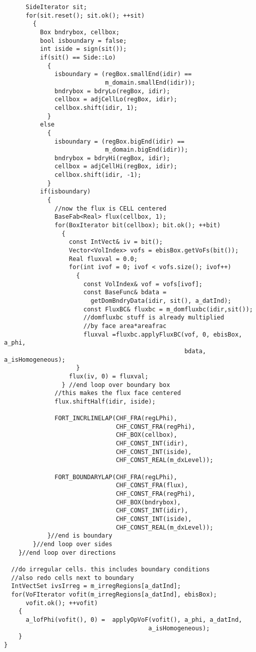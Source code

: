 \begin{small}
\begin{verbatim}
      SideIterator sit;
      for(sit.reset(); sit.ok(); ++sit)
        {
          Box bndrybox, cellbox;
          bool isboundary = false;
          int iside = sign(sit());
          if(sit() == Side::Lo)
            {
              isboundary = (regBox.smallEnd(idir) == 
                            m_domain.smallEnd(idir));
              bndrybox = bdryLo(regBox, idir);
              cellbox = adjCellLo(regBox, idir);
              cellbox.shift(idir, 1);
            }
          else
            {
              isboundary = (regBox.bigEnd(idir) == 
                            m_domain.bigEnd(idir));
              bndrybox = bdryHi(regBox, idir);
              cellbox = adjCellHi(regBox, idir);
              cellbox.shift(idir, -1);
            }
          if(isboundary)
            {
              //now the flux is CELL centered
              BaseFab<Real> flux(cellbox, 1);
              for(BoxIterator bit(cellbox); bit.ok(); ++bit)
                {
                  const IntVect& iv = bit();
                  Vector<VolIndex> vofs = ebisBox.getVoFs(bit());
                  Real fluxval = 0.0;
                  for(int ivof = 0; ivof < vofs.size(); ivof++)
                    {
                      const VolIndex& vof = vofs[ivof];
                      const BaseFunc& bdata = 
                        getDomBndryData(idir, sit(), a_datInd);
                      const FluxBC& fluxbc = m_domfluxbc(idir,sit());
                      //domfluxbc stuff is already multiplied 
                      //by face area*areafrac
                      fluxval =fluxbc.applyFluxBC(vof, 0, ebisBox, a_phi,
                                                  bdata, a_isHomogeneous);
                    }
                  flux(iv, 0) = fluxval;
                } //end loop over boundary box
              //this makes the flux face centered
              flux.shiftHalf(idir, iside);

              FORT_INCRLINELAP(CHF_FRA(regLPhi),
                               CHF_CONST_FRA(regPhi),
                               CHF_BOX(cellbox),
                               CHF_CONST_INT(idir),
                               CHF_CONST_INT(iside),
                               CHF_CONST_REAL(m_dxLevel));

              FORT_BOUNDARYLAP(CHF_FRA(regLPhi),
                               CHF_CONST_FRA(flux),
                               CHF_CONST_FRA(regPhi),
                               CHF_BOX(bndrybox),
                               CHF_CONST_INT(idir),
                               CHF_CONST_INT(iside),
                               CHF_CONST_REAL(m_dxLevel));
            }//end is boundary
        }//end loop over sides
    }//end loop over directions

  //do irregular cells. this includes boundary conditions
  //also redo cells next to boundary
  IntVectSet ivsIrreg = m_irregRegions[a_datInd];
  for(VoFIterator vofit(m_irregRegions[a_datInd], ebisBox);
      vofit.ok(); ++vofit)
    {
      a_lofPhi(vofit(), 0) =  applyOpVoF(vofit(), a_phi, a_datInd,
                                        a_isHomogeneous);
    }
}

\end{verbatim}
\end{small}

